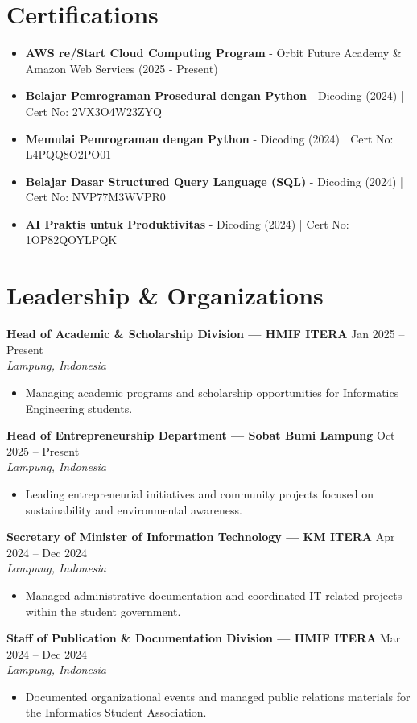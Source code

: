 \documentclass[11pt,a4paper]{article}
\newcommand{\resumeSubheading}[4]{%
  \textbf{#1} \hfill #2 \\
  \textit{#3} \hfill \textit{#4}
}
\begin{document}
\section*{Certifications}
\begin{itemize}
  \item \textbf{AWS re/Start Cloud Computing Program} - Orbit Future Academy \& Amazon Web Services (2025 - Present)
  \item \textbf{Belajar Pemrograman Prosedural dengan Python} - Dicoding (2024) | Cert No: 2VX3O4W23ZYQ
  \item \textbf{Memulai Pemrograman dengan Python} - Dicoding (2024) | Cert No: L4PQQ8O2PO01
  \item \textbf{Belajar Dasar Structured Query Language (SQL)} - Dicoding (2024) | Cert No: NVP77M3WVPR0
  \item \textbf{AI Praktis untuk Produktivitas} - Dicoding (2024) | Cert No: 1OP82QOYLPQK
\end{itemize}

\section*{Leadership \& Organizations}
\resumeSubheading{Head of Academic \& Scholarship Division — HMIF ITERA}{Jan 2025 – Present}{Lampung, Indonesia}{}
\begin{itemize}
  \item Managing academic programs and scholarship opportunities for Informatics Engineering students.
\end{itemize}

\resumeSubheading{Head of Entrepreneurship Department — Sobat Bumi Lampung}{Oct 2025 – Present}{Lampung, Indonesia}{}
\begin{itemize}
  \item Leading entrepreneurial initiatives and community projects focused on sustainability and environmental awareness.
\end{itemize}

\resumeSubheading{Secretary of Minister of Information Technology — KM ITERA}{Apr 2024 – Dec 2024}{Lampung, Indonesia}{}
\begin{itemize}
  \item Managed administrative documentation and coordinated IT-related projects within the student government.
\end{itemize}

\resumeSubheading{Staff of Publication \& Documentation Division — HMIF ITERA}{Mar 2024 – Dec 2024}{Lampung, Indonesia}{}
\begin{itemize}
  \item Documented organizational events and managed public relations materials for the Informatics Student Association.
\end{itemize}
\end{document}
